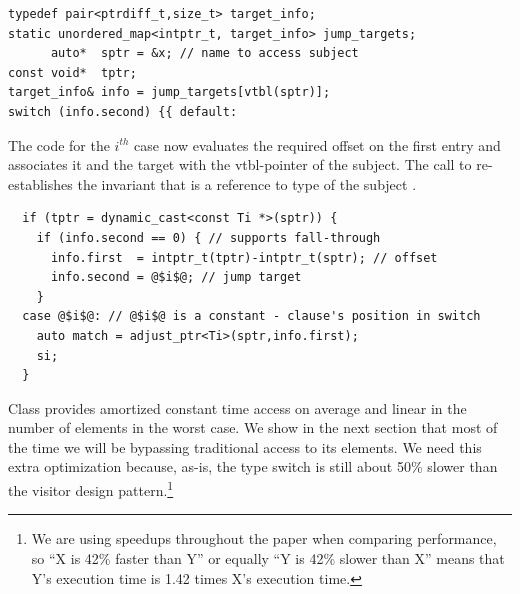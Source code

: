 \begin{lstlisting}
typedef pair<ptrdiff_t,size_t> target_info;
static unordered_map<intptr_t, target_info> jump_targets;
      auto*  sptr = &x; // name to access subject
const void*  tptr; 
target_info& info = jump_targets[vtbl(sptr)];
switch (info.second) {{ default: 
\end{lstlisting}

\noindent
The code for the $i^{th}$ case now evaluates the required offset on the first 
entry and associates it and the target with the vtbl-pointer of the subject.
The call to  re-establishes the invariant that 
 is a reference to type  of the subject .

\begin{lstlisting}
  if (tptr = dynamic_cast<const Ti *>(sptr)) {
    if (info.second == 0) { // supports fall-through
      info.first  = intptr_t(tptr)-intptr_t(sptr); // offset
      info.second = @$i$@; // jump target
    }
  case @$i$@: // @$i$@ is a constant - clause's position in switch
    auto match = adjust_ptr<Ti>(sptr,info.first);
    si;
  }
\end{lstlisting}

\noindent
%

\noindent
Class  provides amortized constant time access on 
average and linear in the number of elements in the worst case. We show in the 
next section that most of the time we will be bypassing traditional access to 
its elements. We need this extra optimization because, as-is, the type switch is 
still about 50\% slower than the visitor design pattern.\footnote{We are using 
speedups throughout the paper when comparing performance, so ``X is 42\% faster 
than Y'' or equally ``Y is 42\% slower than X'' means that Y's execution time is 
1.42 times X's execution time.}

